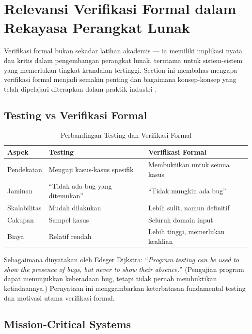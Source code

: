\section{Relevansi Verifikasi Formal dalam Rekayasa Perangkat Lunak}

Verifikasi formal bukan sekadar latihan akademis --- ia memiliki implikasi nyata dan kritis dalam pengembangan perangkat lunak, terutama untuk sistem-sistem yang memerlukan tingkat keandalan tertinggi. Section ini membahas mengapa verifikasi formal menjadi semakin penting dan bagaimana konsep-konsep yang telah dipelajari diterapkan dalam praktik industri \cite{rosen2019}.

\subsection{Testing vs Verifikasi Formal}

\begin{table}[htbp]
\centering
\renewcommand{\arraystretch}{1.3}
\begin{tabular}{|>{\raggedright\arraybackslash}p{4cm}|>{\raggedright\arraybackslash}p{4cm}|>{\raggedright\arraybackslash}p{4.5cm}|}
\hline
\textbf{Aspek} & \textbf{Testing} & \textbf{Verifikasi Formal} \\ \hline
Pendekatan & Menguji kasus-kasus spesifik & Membuktikan untuk semua kasus \\ \hline
Jaminan & ``Tidak ada bug yang ditemukan'' & ``Tidak mungkin ada bug'' \\ \hline
Skalabilitas & Mudah dilakukan & Lebih sulit, namun definitif \\ \hline
Cakupan & Sampel kasus & Seluruh domain input \\ \hline
Biaya & Relatif rendah & Lebih tinggi, memerlukan keahlian \\ \hline
\end{tabular}
\caption{Perbandingan Testing dan Verifikasi Formal}
\end{table}

Sebagaimana dinyatakan oleh Edsger Dijkstra: ``\textit{Program testing can be used to show the presence of bugs, but never to show their absence.}'' (Pengujian program dapat menunjukkan keberadaan bug, tetapi tidak pernah membuktikan ketiadaannya.) Pernyataan ini menggambarkan keterbatasan fundamental testing dan motivasi utama verifikasi formal.

\subsection{Mission-Critical Systems}

